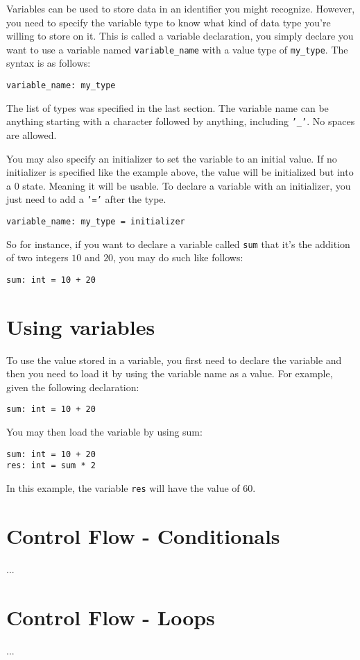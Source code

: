Variables can be used to store data in an identifier you might recognize. However, you need to specify the variable type
to know what kind of data type you're willing to store on it. This is called a variable declaration, you simply declare
you want to use a variable named \texttt{variable\_name} with a value type of \texttt{my\_type}. The syntax is as follows:

\begin{center}
    \texttt{variable\_name: my\_type}
\end{center}

The list of types was specified in the last section. The variable name can be anything starting with a character followed by
anything, including \texttt{'\_'}. No spaces are allowed.

You may also specify an initializer to set the variable to an initial value. If no initializer is specified like the example above,
the value will be initialized but into a 0 state. Meaning it will be usable. To declare a variable with an initializer, you just need
to add a \texttt{'='} after the type.

\begin{center}
    \texttt{variable\_name: my\_type = initializer}
\end{center}

So for instance, if you want to declare a variable called \texttt{sum} that it's the addition of two integers $10$ and $20$,
you may do such like follows:

\begin{center}
    \texttt{sum: int = 10 + 20}
\end{center}

\section{Using variables}

To use the value stored in a variable, you first need to declare the variable and then you need to load it by using the variable
name as a value. For example, given the following declaration:

\begin{center}
    \texttt{sum: int = 10 + 20}
\end{center}

You may then load the variable by using sum:

\begin{center}
    \texttt{sum: int = 10 + 20} \\
    \texttt{res: int = sum * 2}
\end{center}

In this example, the variable \texttt{res} will have the value of $60$.

\section{Control Flow - Conditionals}

...

\section{Control Flow - Loops}

...
